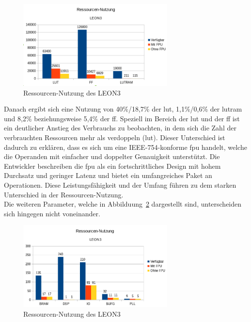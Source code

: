 \begin{figure}[H]
\centering
\includegraphics[width=0.7\textwidth]{Hauptteil/ressourcennutzungleon31.png}
\caption{Ressourcen-Nutzung des LEON3}
\label{fig:ressourcenleon31}
\end{figure}

Danach ergibt sich eine Nutzung von 40\%/18,7\% der \ac{lut}, 1,1\%/0,6\% der \ac{lutram} und 8,2\% beziehungsweise 5,4\% der \ac{ff}.
Speziell im Bereich der \ac{lut} und der \ac{ff} ist ein deutlicher Anstieg des Verbrauchs zu beobachten, in dem sich die Zahl der verbrauchten Ressourcen mehr als verdoppeln (\ac{lut}).
Dieser Unterschied ist dadurch zu erklären, dass es sich um eine IEEE-754-konforme \ac{fpu} handelt, welche die Operanden mit einfacher und doppelter Genauigkeit unterstützt. Die Entwickler
beschreiben die \ac{fpu} als ein fortschrittliches Design mit hohem Durchsatz und geringer Latenz und bietet ein umfangreiches Paket an Operationen. Diese Leistungsfähigkeit und der Umfang
führen zu dem starken Unterschied in der Ressourcen-Nutzung.\\
Die weiteren Parameter, welche in Abbilduung~\ref{fig:ressourcenleon32} dargestellt sind, unterscheiden sich hingegen nicht voneinander.\\

\begin{figure}[H]
\centering
\includegraphics[width=0.7\textwidth]{Hauptteil/ressourcenleon32.png}
\caption{Ressourcen-Nutzung des LEON3}
\label{fig:ressourcenleon32}
\end{figure}

